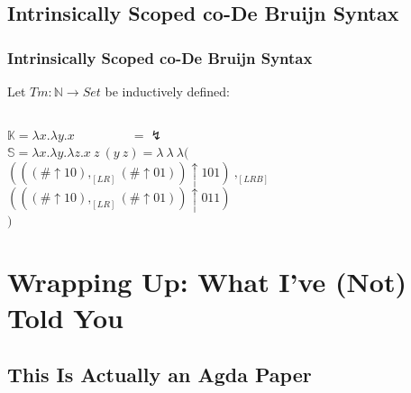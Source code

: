 \documentclass[aspectratio=169]{beamer}
\theoremstyle{remarkstyle}
\begin{document}
\subsection{Intrinsically Scoped co-De Bruijn Syntax}
\begin{frame}[fragile]
  \frametitle{Intrinsically Scoped co-De Bruijn Syntax}
  \begin{definition}
    Let $Tm : ℕ → Set$ be inductively defined: \\
    \begin{columns}
      \begin{column}{0.2\textwidth}
        \begin{center}
        \end{center}
      \end{column}
      \begin{column}{0.3\textwidth}
        \begin{center}
        \end{center}
      \end{column}
      \begin{column}{0.25\textwidth}
        \begin{center}
        \end{center}
      \end{column}
    \end{columns}
  \end{definition}
  \begin{example}
    $𝕂 = λx. λy. x \quad \quad \quad \quad \ \ = \lightning$\\
    $𝕊 = λx. λy. λz. x \ z \ (y \ z) = λ \ λ \ λ($\\
    \quad \quad $(((\# ↑ 10) ,_{[LR]} (\# ↑ 01)) ↑ 101) \ ,_{[LRB]} $\\
    \quad \quad $(((\# ↑ 10) ,_{[LR]} (\# ↑ 01)) ↑ 011) $\\
    $)$
  \end{example}
\end{frame}

\section{Wrapping Up: What I've (Not) Told You}
\subsection{This Is Actually an Agda Paper}
\end{document}
